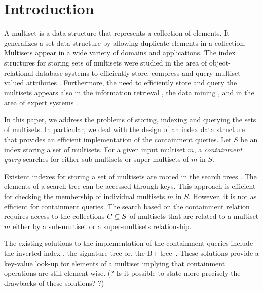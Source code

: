 \section{Introduction} \label{c:introduction}
%
%
A multiset is a data structure that represents a collection of elements. It generalizes a set data structure by allowing duplicate elements in a collection. Multisets appear in a wide variety of domains and applications. The index structures for storing sets of multisets were studied in the area of object-relational database systems to efficiently store, compress and query multiset-valued attributes \cite{bouros2016set,gripon2012compressing,ross2004symmetric,steinruecken2015compressing}. Furthermore, the need to efficiently store and query the multisets appears also in the information retrieval \cite{manning2008introduction,baeza1999modern}, the data mining \cite{interestingSets}, and in the area of expert systems \cite{reteAlgorithm}. 
%

In this paper, we address the problems of storing, indexing and querying the sets of multisets. In particular, we deal with the design of an index data structure that provides an efficient implementation of the containment queries. Let $S$ be an index storing a set of multisets. For a given input multiset $m$, a \emph{containment query} searches for either sub-multisets or super-multisets of $m$ in $S$. 

Existent indexes for storing a set of multisets are rooted in the search trees \cite{rivestBook}. The elements of a search tree can be accessed through keys. This approach is efficient for checking the membership of individual multisets $m$ in $S$. However, it is not as efficient for  containment queries. The search based on the containment relation requires access to the collections $C\subseteq\/S$ of multisets that are related to a multiset $m$ either by a sub-multiset or a super-multisets relationship. 

The existing solutions to the implementation of the containment queries include the inverted index \cite{zobel1992efficient,zobel1998inverted,broder2006indexing}, the signature tree \cite{tousidou2002sigstruc,yangjun2005stree,zobel1998inverted} or, the B+ tree~\cite{Helmer2003,?}. These solutions provide a key-value look-up for elements of a multiset implying that containment operations are still element-wise. (? Is it possible to state more precisely the drawbacks of these solutions? ?) 

